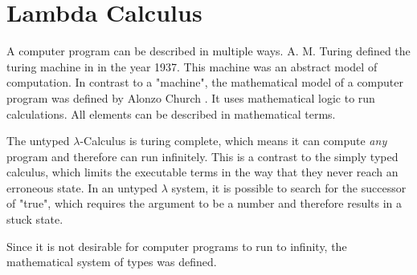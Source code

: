 \section{Lambda Calculus}

A computer program can be described in multiple
ways. A. M. Turing defined the turing machine
in \cite{aturingMachine} in the year 1937. This
machine was an abstract model of computation.
In contrast to a "machine", the mathematical model
of a computer program was defined by Alonzo Church
\cite{churchLogic}. It uses mathematical logic
to run calculations. All elements can be described
in mathematical terms.

The untyped $\lambda$-Calculus is turing complete,
which means it can compute \textit{any} program and
therefore can run infinitely. This is a contrast to
the simply typed calculus, which limits the executable
terms in the way that they never reach an erroneous state.
In an untyped $\lambda$ system, it is possible to search
for the successor of "true", which
requires the argument to be a number and therefore
results in a stuck state.

Since it is not desirable for computer programs to run to infinity,
the mathematical system of types \cite{churchLogic} was defined.



